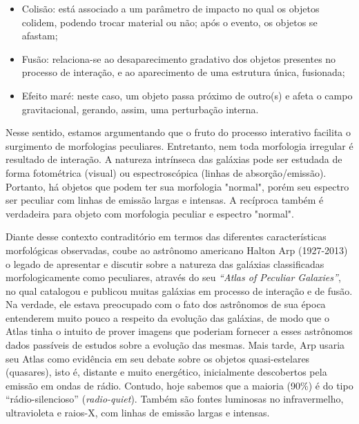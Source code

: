 \begin{itemize}
\item Colisão: está associado a um parâmetro de impacto no qual os objetos colidem, podendo trocar material ou não; após o evento, os objetos se afastam;

\item Fusão: relaciona-se ao desaparecimento gradativo dos objetos presentes no processo de interação, e ao aparecimento de uma estrutura única, fusionada;

\item Efeito maré: neste caso, um objeto passa próximo de outro(s) e afeta o campo gravitacional, gerando, assim, uma perturbação interna.
\end{itemize}
Nesse sentido, estamos argumentando que o fruto do processo interativo facilita o surgimento de morfologias peculiares. Entretanto, nem toda morfologia irregular é resultado de interação. A natureza intrínseca das galáxias pode ser estudada de forma fotométrica (visual) ou espectroscópica (linhas de absorção/emissão). Portanto, há objetos que podem ter sua morfologia "normal", porém seu espectro ser peculiar com linhas de emissão largas e intensas. A recíproca também é verdadeira para objeto com morfologia peculiar e espectro "normal".

Diante desse contexto contraditório em termos das diferentes características morfológicas observadas, coube ao astrônomo americano Halton Arp (1927-2013) o legado de apresentar e discutir sobre a natureza das galáxias classificadas morfologicamente como peculiares, através do seu \textit{“Atlas of Peculiar Galaxies”}, no qual catalogou e publicou \cite{arp1966atlas} muitas galáxias em processo de interação e de fusão. Na verdade, ele estava preocupado com o fato dos astrônomos de sua época entenderem muito pouco a respeito da evolução das galáxias, de modo que o Atlas tinha o intuito de prover imagens que poderiam fornecer a esses astrônomos dados passíveis de estudos sobre a evolução das mesmas. Mais tarde, Arp usaria seu Atlas como evidência em seu debate sobre os objetos quasi-estelares (quasares), isto é, distante e muito energético, inicialmente descobertos pela emissão em ondas de rádio. Contudo, hoje sabemos que a maioria (90\%) é do tipo “rádio-silencioso” (\textit{radio-quiet}). Também são fontes luminosas no infravermelho, ultravioleta e raios-X, com linhas de emissão largas e intensas. 

